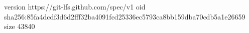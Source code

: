 version https://git-lfs.github.com/spec/v1
oid sha256:85fa4dcdf3d6d2fff32ba4091fcd25336ec5793ca8bb159dba70cdb5a1e26659
size 43840
